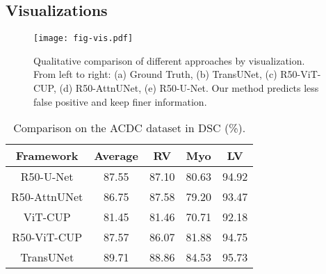 \documentclass[runningheads]{llncs}
\begin{document}
\vspace{-2em}
\subsection{Visualizations}

\begin{figure*}[t]
    \centering
    \texttt{[image: fig-vis.pdf]}
    \caption{Qualitative  comparison  of  different  approaches by visualization.  From  left  to  right:  (a) Ground Truth, (b) TransUNet, (c) R50-ViT-CUP, (d) R50-AttnUNet, (e) R50-U-Net. Our method predicts less false positive and keep finer information.}
    \label{fig:vis}
\end{figure*}

\begin{table}[t]
\scriptsize
\begin{tabular}{c|c|ccc} 
\hline


Framework         & Average          & RV           & Myo        & LV    \\
\hline
R50-U-Net          & 87.55         & 87.10       & 80.63        & 94.92     \\
R50-AttnUNet      & 86.75         & 87.58       & 79.20       & 93.47       \\
ViT-CUP       & 81.45	& 81.46	& 70.71	 & 92.18    \\
R50-ViT-CUP       &  87.57	& 86.07	& 81.88	& 94.75  \\
TransUNet         & 89.71         & 88.86       & 84.53       & 95.73   \\
\hline
\end{tabular}
\caption{Comparison on the ACDC dataset in DSC (\%).}
\label{tab:acdc}
\end{table}
\end{document}
